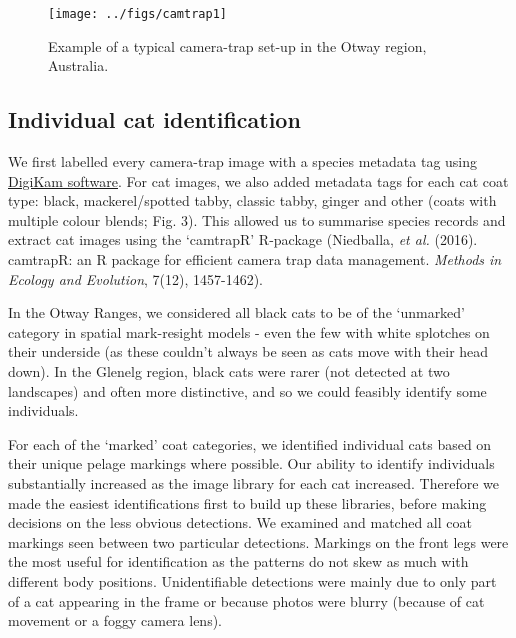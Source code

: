 \documentclass[preprint, 3p, authoryear]{elsarticle} %
\begin{document}
\newpage

\begin{figure}

{\centering \texttt{[image: ../figs/camtrap1]} 

}

\caption{Example of a typical camera-trap set-up in the Otway region, Australia.}\label{fig:density-cam-photo}
\end{figure}

\newpage

\hypertarget{density-app-id}{%
\subsection{Individual cat identification}\label{density-app-id}}

We first labelled every camera-trap image with a species metadata tag using \href{https://www.digikam.org}{DigiKam software}. For cat images, we also added metadata tags for each cat coat type: black, mackerel/spotted tabby, classic tabby, ginger and other (coats with multiple colour blends; Fig. 3). This allowed us to summarise species records and extract cat images using the `camtrapR' R-package (Niedballa, \emph{et al.} (2016). camtrapR: an R package for efficient camera trap data management. \emph{Methods in Ecology and Evolution}, 7(12), 1457-1462).

In the Otway Ranges, we considered all black cats to be of the `unmarked' category in spatial mark-resight models - even the few with white splotches on their underside (as these couldn't always be seen as cats move with their head down). In the Glenelg region, black cats were rarer (not detected at two landscapes) and often more distinctive, and so we could feasibly identify some individuals.

For each of the `marked' coat categories, we identified individual cats based on their unique pelage markings where possible. Our ability to identify individuals substantially increased as the image library for each cat increased. Therefore we made the easiest identifications first to build up these libraries, before making decisions on the less obvious detections. We examined and matched all coat markings seen between two particular detections. Markings on the front legs were the most useful for identification as the patterns do not skew as much with different body positions. Unidentifiable detections were mainly due to only part of a cat appearing in the frame or because photos were blurry (because of cat movement or a foggy camera lens).
\end{document}
